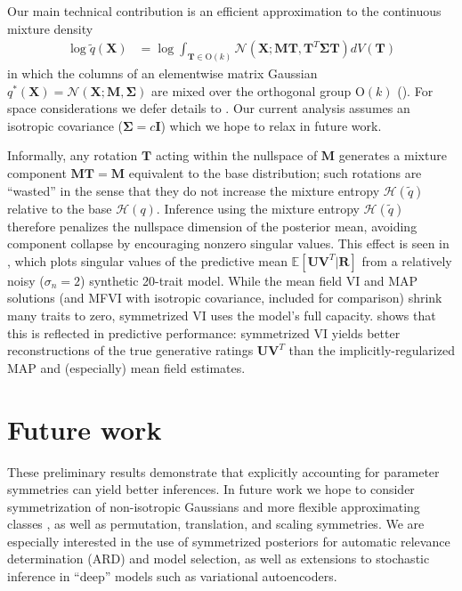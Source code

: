 \documentclass{article}
\newcommand{\N}{\mathcal{N}}
\newcommand{\E}{\mathbb{E}}
\renewcommand{\O}{\text{O}}
\renewcommand{\v}[1]{\mathbf{#1}}
\newcommand{\I}{\v{I}}
\begin{document}
Our main technical contribution is an efficient approximation to the continuous mixture density
\begin{align*}
\log \tilde{q}(\v{X}) &= \log \int_{\v{T}\in \O(k)} \N(\v{X}; \v{M}\v{T}, \v{T}^T\v{\Sigma} \v{T}) dV(\v{T})
\end{align*}
in which the columns of an elementwise matrix Gaussian $q^*(\v{X})=\N(\v{X}; \v{M}, \v{\Sigma})$ are
mixed over the orthogonal group $\O(k)$ (). For space considerations
we defer details to . Our current analysis
assumes an isotropic covariance ($\v{\Sigma}=c\I$) which we hope to relax in future work. 

Informally, any rotation $\v{T}$ acting within the nullspace of $\v{M}$
generates a mixture component $\v{M}\v{T}=\v{M}$ equivalent to the base distribution;
such rotations are ``wasted'' in the sense that they do not increase
the mixture entropy $\mathcal{H}(\tilde{q})$ relative to the base
$\mathcal{H}(q)$. Inference using the mixture entropy $\mathcal{H}(\tilde{q})$
therefore penalizes the nullspace dimension of the posterior mean, avoiding component collapse by encouraging nonzero singular values. This effect is seen in , which plots
singular values of the predictive mean $\E[\v{U}\v{V}^T | \v{R}]$ from a relatively noisy
($\sigma_n=2$) synthetic 20-trait model. While the mean field VI and MAP
solutions (and MFVI with isotropic covariance, included
for comparison) shrink many traits to zero, symmetrized VI uses
the model's full capacity.  shows that this is
reflected in predictive performance: symmetrized VI yields better
reconstructions of the true
generative ratings $\v{U}\v{V}^T$ than the implicitly-regularized MAP
and (especially) mean field estimates. 

\section{Future work}

These preliminary results demonstrate that explicitly accounting for
parameter symmetries can yield better inferences. In future work we
hope to consider symmetrization of non-isotropic Gaussians and
more flexible approximating classes
\citep{salimans2015markov,rezende2015variational,tran2016variational},
as well as permutation, translation, and scaling symmetries. We are
especially interested in the use of symmetrized posteriors for
automatic relevance determination (ARD) and model selection,
as well as extensions to stochastic inference in ``deep'' models
such as variational autoencoders.
\end{document}

